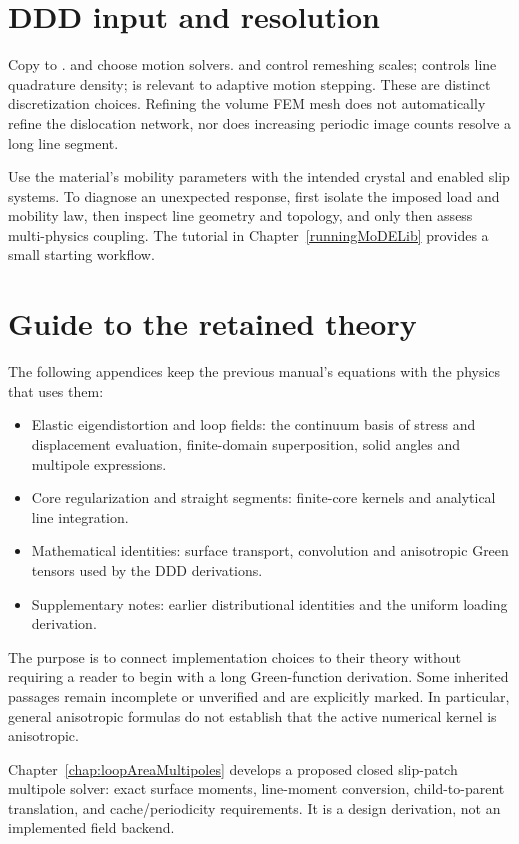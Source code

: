 \section{DDD input and resolution}
Copy  to .  and  choose motion solvers.  and  control remeshing scales;  controls line quadrature density;  is relevant to adaptive motion stepping. These are distinct discretization choices. Refining the volume FEM mesh does not automatically refine the dislocation network, nor does increasing periodic image counts resolve a long line segment.

Use the material's mobility parameters with the intended crystal and enabled slip systems. To diagnose an unexpected response, first isolate the imposed load and mobility law, then inspect line geometry and topology, and only then assess multi-physics coupling. The tutorial in Chapter~\ref{runningMoDELib} provides a small starting workflow.

\section{Guide to the retained theory}
The following appendices keep the previous manual's equations with the physics that uses them:
\begin{itemize}
\item Elastic eigendistortion and loop fields: the continuum basis of stress and displacement evaluation, finite-domain superposition, solid angles and multipole expressions.
\item Core regularization and straight segments: finite-core kernels and analytical line integration.
\item Mathematical identities: surface transport, convolution and anisotropic Green tensors used by the DDD derivations.
\item Supplementary notes: earlier distributional identities and the uniform loading derivation.
\end{itemize}
The purpose is to connect implementation choices to their theory without requiring a reader to begin with a long Green-function derivation. Some inherited passages remain incomplete or unverified and are explicitly marked. In particular, general anisotropic formulas do not establish that the active numerical kernel is anisotropic.

Chapter~\ref{chap:loopAreaMultipoles} develops a proposed closed slip-patch multipole solver: exact surface moments, line-moment conversion, child-to-parent translation, and cache/periodicity requirements. It is a design derivation, not an implemented field backend.
